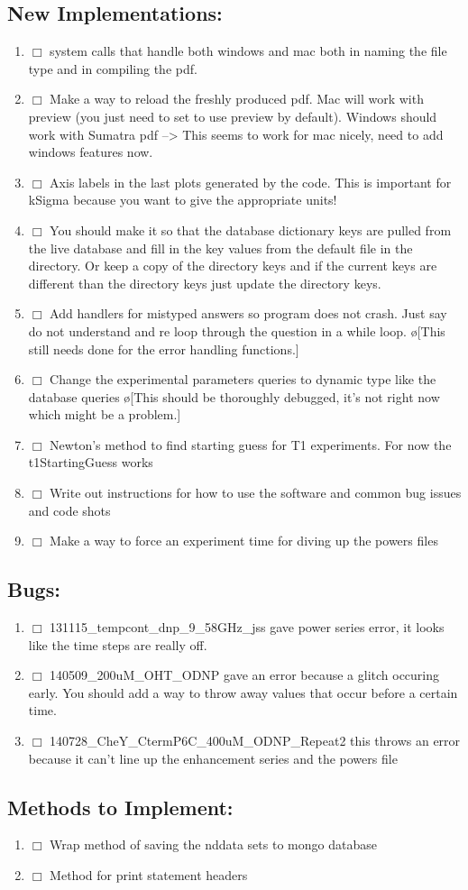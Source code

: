 \documentclass[10pt]{book}
\begin{document}
\subsection{New Implementations:}
\begin{enumerate}
    \item $\Box$ system calls that handle both windows and mac both in naming the file type and in compiling the pdf.
    \item $\Box$ Make a way to reload the freshly produced pdf. Mac will work with preview (you just need to set to use preview by default). Windows should work with Sumatra pdf --> This seems to work for mac nicely, need to add windows features now.
    \item $\Box$ Axis labels in the last plots generated by the code. This is important for kSigma because you want to give the appropriate units!
    \item $\Box$ You should make it so that the database dictionary keys are pulled from the live database and fill in the key values from the default file in the directory. Or keep a copy of the directory keys and if the current keys are different than the directory keys just update the directory keys.
    \item $\Box$ Add handlers for mistyped answers so program does not crash. Just say do not understand and re loop through the question in a while loop. \o[This still needs done for the error handling functions.]{}
    \item $\Box$ Change the experimental parameters queries to dynamic type like the database queries \o[This should be thoroughly debugged, it's not right now which might be a problem.]{}
    \item $\Box$ Newton's method to find starting guess for T1 experiments. For now the t1StartingGuess works 
    \item $\Box$ Write out instructions for how to use the software and common bug issues and code shots
    \item $\Box$ Make a way to force an experiment time for diving up the powers files
\end{enumerate}
\subsection{Bugs:}
\begin{enumerate}
    \item $\Box$ 131115_tempcont_dnp_9_58GHz_jss gave power series error, it looks like the time steps are really off.
    \item $\Box$ 140509_200uM_OHT_ODNP gave an error because a glitch occuring early. You should add a way to throw away values that occur before a certain time.
    \item $\Box$ 140728_CheY_CtermP6C_400uM_ODNP_Repeat2 this throws an error because it can't line up the enhancement series and the powers file
\end{enumerate}
\subsection{Methods to Implement:}
\begin{enumerate}
    \item $\Box$ Wrap method of saving the nddata sets to mongo database
    \item $\Box$ Method for print statement headers
\end{enumerate}
\end{document}

